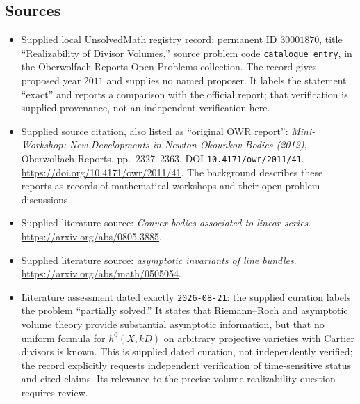 \documentclass[11pt]{article}
\begin{document}
\subsection{Sources}
\begin{itemize}
\item Supplied local UnsolvedMath registry record: permanent ID \(30001870\), title ``Realizability of Divisor Volumes,'' source problem code \texttt{catalogue entry}, in the Oberwolfach Reports Open Problems collection. The record gives proposed year \(2011\) and supplies no named proposer. It labels the statement ``exact'' and reports a comparison with the official report; that verification is supplied provenance, not an independent verification here.
\item Supplied source citation, also listed as ``original OWR report'': \emph{Mini-Workshop: New Developments in Newton-Okounkov Bodies (2012)}, Oberwolfach Reports, pp.~2327--2363, DOI \texttt{10.4171/owr/2011/41}. \url{https://doi.org/10.4171/owr/2011/41}. The background describes these reports as records of mathematical workshops and their open-problem discussions.
\item Supplied literature source: \emph{Convex bodies associated to linear series}. \url{https://arxiv.org/abs/0805.3885}.
\item Supplied literature source: \emph{asymptotic invariants of line bundles}. \url{https://arxiv.org/abs/math/0505054}.
\item Literature assessment dated exactly \texttt{2026-08-21}: the supplied curation labels the problem ``partially solved.'' It states that Riemann--Roch and asymptotic volume theory provide substantial asymptotic information, but that no uniform formula for \(h^0(X,kD)\) on arbitrary projective varieties with Cartier divisors is known. This is supplied dated curation, not independently verified; the record explicitly requests independent verification of time-sensitive status and cited claims. Its relevance to the precise volume-realizability question requires review.
\end{itemize}
\end{document}
